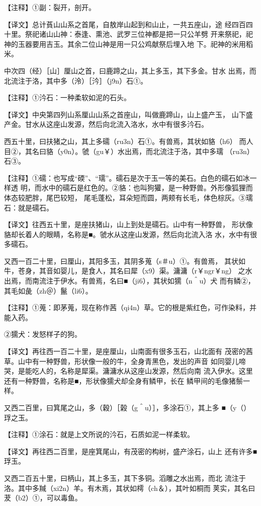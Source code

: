 \documentclass[a4paper,12pt,UTF8,twoside]{ctexbook}
\begin{document}
【注释】①副：裂开，剖开。

【译文】总计萯山山系之首尾，自敖岸山起到和山止，一共五座山，途 经四百四十里。祭祀诸山山神：泰逢、熏池、武罗三位神都是把一只公羊劈 开来祭祀，祀神的玉器要用吉玉。其余二位山神是用一只公鸡献祭后埋入地 下。祀神的米用稻米。

中次四（经）［山］厘山之首，曰鹿蹄之山，其上多玉，其下多金。甘水 出焉，而北流注于洛，其中多（泠）［汵］（j9n）石①。

【注释】①汵石：一种柔软如泥的石头。

【译文】中央第四列山系厘山山系之首座山，叫做鹿蹄山，山上盛产玉， 山下盛产金。甘水从这座山发源，然后向北流入洛水，水中有很多汵石。

西五十里，曰扶猪之山，其上多礝（ru3n）石①。有兽焉，其状如貉（h6） 而人目②，其名曰貉（y0n）。虢（gu￥）水出焉，而北流注于洛，其中多瓀 （ru3n）石③。

【注释】①礝：也写成“碝”、“瓀”。礝石是次于玉一等的美石。白色的礝石如冰一样透 明，而水中的礝石是红色的。②貉：也叫狗獾，是一种野兽。外形像狐狸而体态较肥胖，尾巴较短， 尾毛蓬松，耳朵短而圆，两颊有长毛，体色棕灰。③瓀石：就是礝石。

【译文】往西五十里，是座扶猪山，山上到处是礝石。山中有一种野兽， 形状像貉却长着人的眼睛，名称是■。虢水从这座山发源，然后向北流入洛 水，水中有很多礝石。

又西一百二十里，曰厘山，其阳多玉，其阴多蒐（s＃u）①。有兽焉， 其状如牛，苍身，其音如婴儿，是食人，其名曰犀（x9）渠。滽滽（r￥ngr￥ng） 之水出焉，而南流注于伊水。有兽焉，名曰■（ji6），其状如獳（n＾u）犬 而有鳞②，其毛如彘（zh＠）鬣（li6）。

【注释】①蒐：即茅蒐，现在称作茜（qi4n）草。它的根是紫红色，可作染料，并能入药。

②獳犬：发怒样子的狗。

【译文】再往西一百二十里，是座厘山，山南面有很多玉石，山北面有 茂密的茜草。山中有一种野兽，形状像一般的牛，全身青黑色，发出的声音 如同婴儿啼哭，是能吃人的，名称是犀渠。滽滽水从这座山发源，然后向南 流入伊水。这里还有一种野兽，名称是■，形状像獳犬却全身有鳞甲，长在 鳞甲间的毛像猪鬃一样。

又西二百里，曰箕尾之山，多（穀）［榖（g＾u）］，多涂石①，其上多 ■（y（）琈之玉。

【注释】①涂石：就是上文所说的汵石，石质如泥一样柔软。

【译文】再往西二百里，是座箕尾山，有茂密的构树，盛产涂石，山上 还有许多■琈玉。

又西二百五十里，曰柄山，其上多玉，其下多铜。滔雕之水出焉，而北 流注于洛。其中多羬（xi2n）羊。有木焉，其状如樗（ch＆），其叶如桐而 荚实，其名曰茇（b2）①，可以毒鱼。
\end{document}
